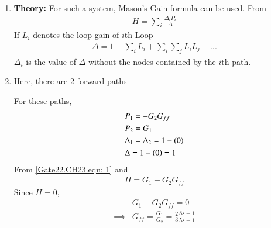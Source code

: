 \documentclass[journal,12pt,twocolumn]{IEEEtran}
\theoremstyle{remark}
\begin{document}
\begin{enumerate}
    \item \textbf{Theory:} For such a system, Mason's Gain formula can be used. From 
\begin{align}
    H=\sum_i \frac{\Delta_i P_i}{\Delta} \label{Gate22.CH23.eqn: 1}
\end{align}
If $L_i$ denotes the loop gain of $i$th Loop 
\begin{align}
    \Delta=1-\sum_i L_i + \sum_i \sum_j L_iL_j  - ...
\end{align}
$\Delta_i$ is the value of  $\Delta$ without the nodes contained by the $i$th path.\\
\item Here, there are 2 forward paths 
\begin{center}
\end{center} 
For these paths, 
\begin{align}
    &P_1 = -G_2 G_{ff}\\
    &P_2 = G_1 \\
    &\Delta_1  = \Delta_2=1-\left(0\right)\\
    &\Delta =  1-\left(0\right)=1
\end{align}
From \eqref{Gate22.CH23.eqn: 1} and 
\begin{align}
    H=G_1-G_2G_{ff}
\end{align}
Since $H=0$, 
\begin{align}
    &G_1-G_2G_{ff} = 0\\
    \implies &G_{ff} = \frac{G_1}{G_2} =\frac{2}{3} \frac{8s+1}{5s+1}
\end{align}
\end{enumerate}
\end{document}
